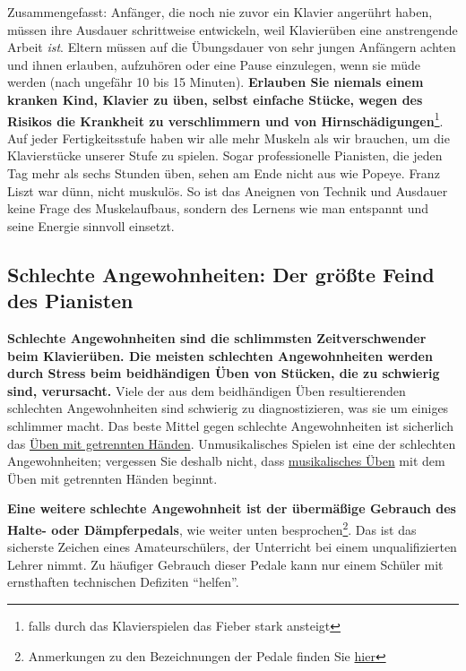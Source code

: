 Zusammengefasst: Anfänger, die noch nie zuvor ein Klavier angerührt haben, müssen ihre Ausdauer schrittweise entwickeln, weil Klavierüben eine anstrengende Arbeit \textit{ist}.
Eltern müssen auf die Übungsdauer von sehr jungen Anfängern achten und ihnen erlauben, aufzuhören oder eine Pause einzulegen, wenn sie müde werden (nach ungefähr 10 bis 15 Minuten).
\textbf{Erlauben Sie niemals einem kranken Kind, Klavier zu üben, selbst einfache Stücke, wegen des Risikos die Krankheit zu verschlimmern und von Hirnschädigungen}\footnote{falls durch das Klavierspielen das Fieber stark ansteigt}.
Auf jeder Fertigkeitsstufe haben wir alle mehr Muskeln als wir brauchen, um die Klavierstücke unserer Stufe zu spielen.
Sogar professionelle Pianisten, die jeden Tag mehr als sechs Stunden üben, sehen am Ende nicht aus wie Popeye.
Franz Liszt war dünn, nicht muskulös.
So ist das Aneignen von Technik und Ausdauer keine Frage des Muskelaufbaus, sondern des Lernens wie man entspannt und seine Energie sinnvoll einsetzt.
 


\subsection{Schlechte Angewohnheiten: Der größte Feind des Pianisten}
\label{c1ii22}

\textbf{Schlechte Angewohnheiten sind die schlimmsten Zeitverschwender beim Klavierüben.
Die meisten schlechten Angewohnheiten werden durch Stress beim beidhändigen Üben von Stücken, die zu schwierig sind, verursacht.}
Viele der aus dem beidhändigen Üben resultierenden schlechten Angewohnheiten sind schwierig zu diagnostizieren, was sie um einiges schlimmer macht.
Das beste Mittel gegen schlechte Angewohnheiten ist sicherlich das \hyperref[c1ii7]{Üben mit getrennten Händen}.
Unmusikalisches Spielen ist eine der schlechten Angewohnheiten; vergessen Sie deshalb nicht, dass \hyperref[c1iii14d]{musikalisches Üben} mit dem Üben mit getrennten Händen beginnt.

\textbf{Eine weitere schlechte Angewohnheit ist der übermäßige Gebrauch des Halte- oder Dämpferpedals}, wie weiter unten besprochen\footnote{Anmerkungen zu den Bezeichnungen der Pedale finden Sie \hyperref[Pedale]{hier}}.
Das ist das sicherste Zeichen eines Amateurschülers, der Unterricht bei einem unqualifizierten Lehrer nimmt.
Zu häufiger Gebrauch dieser Pedale kann nur einem Schüler mit ernsthaften technischen Defiziten \enquote{helfen}.

